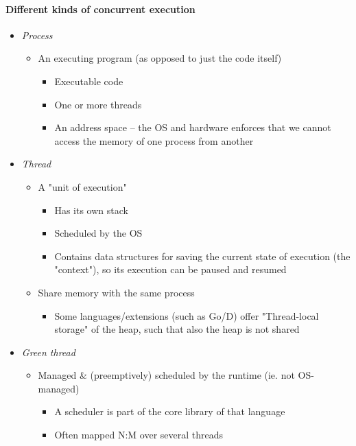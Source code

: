 \paragraph{Different kinds of concurrent execution}
\begin{itemize}
	\item \textit{Process}
		\begin{itemize}[nolistsep,noitemsep]
			\item An executing program (as opposed to just the code itself)
			\begin{itemize}[nolistsep,noitemsep]
				\item Executable code
				\item One or more threads
				\item An address space -- the OS and hardware enforces that we cannot access the memory of one process from another
			\end{itemize}
		\end{itemize}
	\item \textit{Thread}
		\begin{itemize}[nolistsep,noitemsep]
			\item A "unit of execution"
			\begin{itemize}[nolistsep,noitemsep]
				\item Has its own stack
				\item Scheduled by the OS
				\item Contains data structures for saving the current state of execution (the "context"), so its execution can be paused and resumed
			\end{itemize}
			\item Share memory with the same process
			\begin{itemize}[nolistsep,noitemsep]
				\item Some languages/extensions (such as Go/D) offer "Thread-local storage" of the heap, such that also the heap is not shared
			\end{itemize}
		\end{itemize}
	\item \textit{Green thread}
		\begin{itemize}[nolistsep,noitemsep]
			\item Managed \& (preemptively) scheduled by the runtime (ie. not OS-managed)
				\begin{itemize}[nolistsep,noitemsep]
					\item A scheduler is part of the core library of that language
					\item Often mapped N:M over several threads

\end{itemize}
\end{itemize}
\end{itemize}
